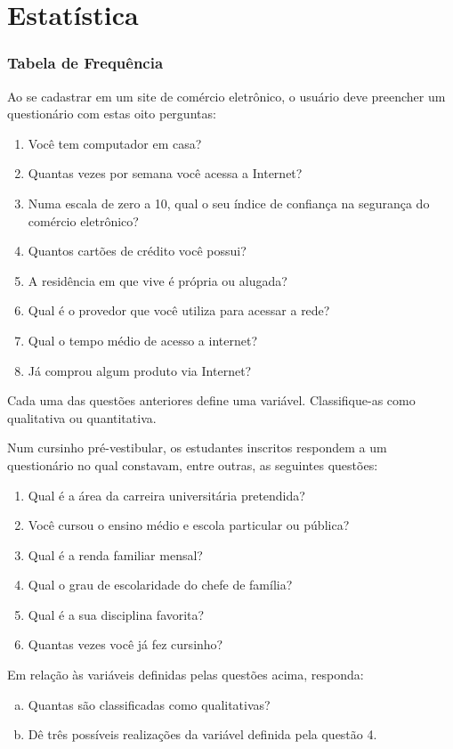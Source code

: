 \chapter{Estatística}
\subsection{Tabela de Frequência}

	\item Ao se cadastrar em um site de comércio eletrônico, o usuário deve preencher um questionário com estas oito perguntas:
	\begin{multicols}{2}
	\begin{enumerate}[1 -]
		\item Você tem computador em casa?
		\item Quantas vezes por semana você acessa a Internet?
		\item Numa escala de zero a 10, qual o seu índice de confiança na segurança do comércio eletrônico?
		\item Quantos cartões de crédito você possui?
		\item A residência em que vive é própria ou alugada?
		\item Qual é o provedor que você utiliza para acessar a rede?
		\item Qual o tempo médio de acesso a internet?
		\item Já comprou algum produto via Internet?
	\end{enumerate}
	\end{multicols}
	Cada uma das questões anteriores define uma variável. Classifique-as como qualitativa ou quantitativa.
	
	\item Num cursinho pré-vestibular, os estudantes inscritos respondem a um questionário no qual constavam, entre outras, as seguintes questões:
	\begin{enumerate}[1 -]
		\item Qual é a área da carreira universitária pretendida?
		\item Você cursou o ensino médio e escola particular ou pública?
		\item Qual é a renda familiar mensal?
		\item Qual o grau de escolaridade do chefe de família?
		\item Qual é a sua disciplina favorita?
		\item Quantas vezes você já fez cursinho?
	\end{enumerate}
	Em relação às variáveis definidas pelas questões acima, responda:
	\begin{enumerate}[a)]
		\item Quantas são classificadas como qualitativas?
		\item Dê três possíveis realizações da variável definida pela questão 4.
	\end{enumerate}
	
